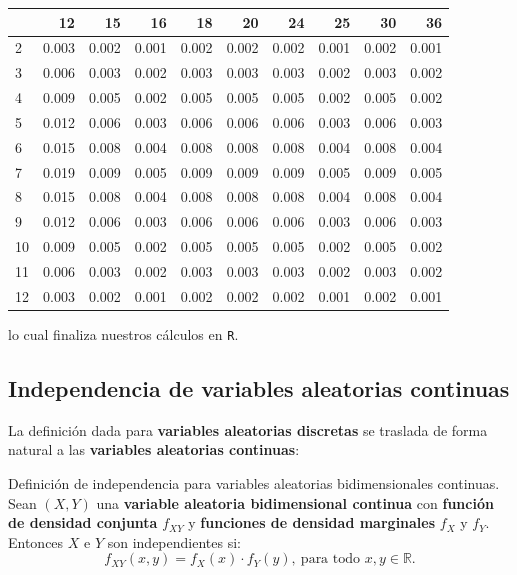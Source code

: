 \documentclass[]{book}
\begin{document}
\begin{tabular}{l|r|r|r|r|r|r|r|r|r}
\hline
  & 12 & 15 & 16 & 18 & 20 & 24 & 25 & 30 & 36\\
\hline
2 & 0.003 & 0.002 & 0.001 & 0.002 & 0.002 & 0.002 & 0.001 & 0.002 & 0.001\\
\hline
3 & 0.006 & 0.003 & 0.002 & 0.003 & 0.003 & 0.003 & 0.002 & 0.003 & 0.002\\
\hline
4 & 0.009 & 0.005 & 0.002 & 0.005 & 0.005 & 0.005 & 0.002 & 0.005 & 0.002\\
\hline
5 & 0.012 & 0.006 & 0.003 & 0.006 & 0.006 & 0.006 & 0.003 & 0.006 & 0.003\\
\hline
6 & 0.015 & 0.008 & 0.004 & 0.008 & 0.008 & 0.008 & 0.004 & 0.008 & 0.004\\
\hline
7 & 0.019 & 0.009 & 0.005 & 0.009 & 0.009 & 0.009 & 0.005 & 0.009 & 0.005\\
\hline
8 & 0.015 & 0.008 & 0.004 & 0.008 & 0.008 & 0.008 & 0.004 & 0.008 & 0.004\\
\hline
9 & 0.012 & 0.006 & 0.003 & 0.006 & 0.006 & 0.006 & 0.003 & 0.006 & 0.003\\
\hline
10 & 0.009 & 0.005 & 0.002 & 0.005 & 0.005 & 0.005 & 0.002 & 0.005 & 0.002\\
\hline
11 & 0.006 & 0.003 & 0.002 & 0.003 & 0.003 & 0.003 & 0.002 & 0.003 & 0.002\\
\hline
12 & 0.003 & 0.002 & 0.001 & 0.002 & 0.002 & 0.002 & 0.001 & 0.002 & 0.001\\
\hline
\end{tabular}

lo cual finaliza nuestros cálculos en \texttt{R}.

\hypertarget{independencia-de-variables-aleatorias-continuas}{%
\subsection{Independencia de variables aleatorias continuas}\label{independencia-de-variables-aleatorias-continuas}}

La definición dada para \textbf{variables aleatorias discretas} se traslada de forma natural a las \textbf{variables aleatorias continuas}:

Definición de independencia para variables aleatorias bidimensionales continuas.
Sean \((X,Y)\) una \textbf{variable aleatoria bidimensional continua} con \textbf{función de densidad conjunta} \(f_{XY}\) y \textbf{funciones de densidad marginales} \(f_X\) y \(f_Y\). Entonces \(X\) e \(Y\) son independientes si:
\[
f_{XY}(x,y)=f_X(x)\cdot f_Y(y),\ \mbox{para todo $x,y\in\mathbb{R}$.}
\]
\end{document}
